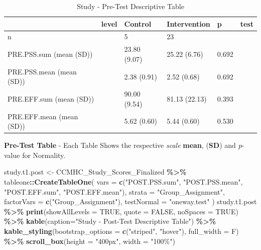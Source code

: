 \documentclass[
]{article}
\newenvironment{Shaded}{\begin{snugshade}}{\end{snugshade}}
\newcommand{\AttributeTok}[1]{\textcolor[rgb]{0.13,0.29,0.53}{#1}}
\newcommand{\ConstantTok}[1]{\textcolor[rgb]{0.56,0.35,0.01}{#1}}
\newcommand{\FunctionTok}[1]{\textcolor[rgb]{0.13,0.29,0.53}{\textbf{#1}}}
\newcommand{\NormalTok}[1]{#1}
\newcommand{\OtherTok}[1]{\textcolor[rgb]{0.56,0.35,0.01}{#1}}
\newcommand{\SpecialCharTok}[1]{\textcolor[rgb]{0.81,0.36,0.00}{\textbf{#1}}}
\newcommand{\StringTok}[1]{\textcolor[rgb]{0.31,0.60,0.02}{#1}}
\begin{document}
\begin{longtable}[t]{llllll}
\caption{\label{tab:unnamed-chunk-5}Study - Pre-Test Descriptive Table}\\
\toprule
 & level & Control & Intervention & p & test\\
\midrule
n &  & 5 & 23 &  & \\
PRE.PSS.sum (mean (SD)) &  & 23.80 (9.07) & 25.22 (6.76) & 0.692 & \\
PRE.PSS.mean (mean (SD)) &  & 2.38 (0.91) & 2.52 (0.68) & 0.692 & \\
PRE.EFF.sum (mean (SD)) &  & 90.00 (9.54) & 81.13 (22.13) & 0.393 & \\
PRE.EFF.mean (mean (SD)) &  & 5.62 (0.60) & 5.44 (0.60) & 0.530 & \\
\bottomrule
\end{longtable}

\textbf{Pre-Test Table} - Each Table Shows the respective \emph{scale}
\textbf{mean}, (\textbf{SD}) and \emph{p}-value for Normality.

\begin{Shaded}
\begin{Highlighting}[]
\NormalTok{study.t1.post }\OtherTok{\textless{}{-}} 
\NormalTok{  CCMHC\_Study\_Scores\_Finalized }\SpecialCharTok{\%\textgreater{}\%} 
\NormalTok{tableone}\SpecialCharTok{::}\FunctionTok{CreateTableOne}\NormalTok{(}
  \AttributeTok{vars =} \FunctionTok{c}\NormalTok{(}\StringTok{"POST.PSS.sum"}\NormalTok{, }\StringTok{"POST.PSS.mean"}\NormalTok{, }\StringTok{"POST.EFF.sum"}\NormalTok{, }\StringTok{"POST.EFF.mean"}\NormalTok{),}
  \AttributeTok{strata =} \StringTok{"Group\_Assignment"}\NormalTok{,}
  \AttributeTok{factorVars =} \FunctionTok{c}\NormalTok{(}\StringTok{"Group\_Assignment"}\NormalTok{),}
  \AttributeTok{testNormal =} \StringTok{"oneway.test"}
\NormalTok{) }
\NormalTok{study.t1.post }\SpecialCharTok{\%\textgreater{}\%}   \FunctionTok{print}\NormalTok{(}\AttributeTok{showAllLevels =} \ConstantTok{TRUE}\NormalTok{, }\AttributeTok{quote =} \ConstantTok{FALSE}\NormalTok{, }\AttributeTok{noSpaces =} \ConstantTok{TRUE}\NormalTok{) }\SpecialCharTok{\%\textgreater{}\%} 
  \FunctionTok{kable}\NormalTok{(}\AttributeTok{caption=}\StringTok{"Study {-} Post{-}Test Descriptive Table"}\NormalTok{) }\SpecialCharTok{\%\textgreater{}\%} 
  \FunctionTok{kable\_styling}\NormalTok{(}\AttributeTok{bootstrap\_options =} \FunctionTok{c}\NormalTok{(}\StringTok{"striped"}\NormalTok{, }\StringTok{"hover"}\NormalTok{), }\AttributeTok{full\_width =}\NormalTok{ F) }\SpecialCharTok{\%\textgreater{}\%}    \FunctionTok{scroll\_box}\NormalTok{(}\AttributeTok{height =} \StringTok{"400px"}\NormalTok{, }\AttributeTok{width =} \StringTok{"100\%"}\NormalTok{)}
\end{Highlighting}
\end{Shaded}
\end{document}
